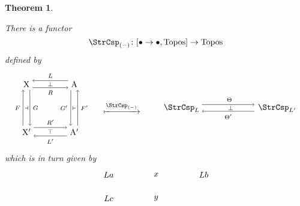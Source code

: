 \documentclass{amsart}
\newcommand{\A}{\cat{A}}
\newcommand{\X}{\cat{X}}
\newcommand{\Topos}{\cat{Topos}}
\newcommand{\cat}[1]{\mathrm{#1}}
\newcommand{\from}{\colon}
\newtheorem{theorem}{Theorem}[section]
\theoremstyle{remark}
\theoremstyle{definition}
\begin{document}
\begin{theorem} \label{thm:strcsp-isfunctorial}

  There is a functor
  \[
    \StrCsp_{(-)} \from
    [ \bullet \to \bullet , \Topos ]
    \to
    \Topos
  \]
  defined by  
  \[
    \begin{tikzpicture}
      \begin{scope}
      \node (1) at (-1,1) {\( \X \)};
      \node (2) at (-1,-1) {\( \X' \)};
      \node (3) at (1,1) {\( \A \)};
      \node (4) at (1,-1) {\( \A' \)};
      \draw [->] (1.-60) to node [right] {\scriptsize{\( G \)}} (2.60);
      \draw [<-] (1.-120) to node [left] {\scriptsize{\( F \)}} (2.120);
      \draw [<-] (1.30) to node [above] {\scriptsize{\( L \)}} (3.150);  
      \draw [->] (1.-30) to node [below] {\scriptsize{\( R \)}} (3.-150);
      \draw [->] (2.30) to node [above] {\scriptsize{\( R' \)}} (4.150);
      \draw [<-] (2.-30) to node [below] {\scriptsize{\( L' \)}} (4.-150);      
      \draw [<-] (3.-60) to node [right] {\scriptsize{\( F' \)}} (4.60);
      \draw [->] (3.-120) to node [left] {\scriptsize{\( G' \)}}
      (4.120);
      \node (5) at (0,-1) {\scriptsize{\( \top \)}};
      \node (6) at (0,1) {\scriptsize{\( \perp \)}};
      \node (7) at (-1,0) {\scriptsize{\( \dashv \)}};
      \node (8) at (1,0) {\scriptsize{\( \vdash \)}};
      \end{scope}
      \begin{scope}[shift={(3,0)}]
      \node (1) at (0,0) { $\xmapsto{ \StrCsp_{(-)} }$ };
      \end{scope}
      \begin{scope}[shift={(5.5,0)}]
      \node (1) [inner sep=0.1cm] at (0,0) {\( \StrCsp_{L} \)};
      \node (2) [inner sep=0.15cm] at (4,0) {\( \StrCsp_{L'} \)};
      \node (3) at (2,0) {\scriptsize{ \( \perp \) }};
      \draw [->]
        ([yshift= 4pt]1.east) to
        node [above] {\scriptsize{ \( \Theta \) }}
        ([yshift= 4pt]2.west);
      \draw [->]
        ([yshift= -4pt]2.west) to
        node [below] {\scriptsize{ \( \Theta' \) } }
        ([yshift= -4pt]1.east);  
      \end{scope}
    \end{tikzpicture}
  \]
  which is in turn given by
  \[
    \begin{tikzpicture}
      \begin{scope}
      \node (1) at (-2,1) {\( La \)};
      \node (2) at (0,1) {\( x \)};
      \node (3) at (2,1) {\( Lb \)};
      \node (4) at (-2,0) {\( Lc \)};
      \node (5) at (0,0) {\( y \)};

\end{scope}
\end{tikzpicture}\]
\end{theorem}
\end{document}
